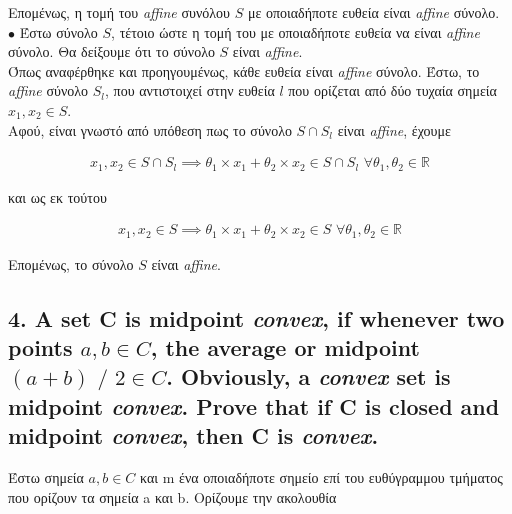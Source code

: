 \documentclass[12pt]{article}
\newcommand{\R}{\mathbb{R}}
\newcommand{\margin}{\hspace{4pt}}
\begin{document}
Επομένως, η τομή του \textit{affine} συνόλου $S$ με οποιαδήποτε ευθεία είναι \textit{affine} σύνολο.\\

$\bullet$ Έστω σύνολο $S$, τέτοιο ώστε η τομή του με οποιαδήποτε ευθεία να είναι \textit{affine} σύνολο.
Θα δείξουμε ότι το σύνολο $S$ είναι \textit{affine}.\\

Όπως αναφέρθηκε και προηγουμένως, κάθε ευθεία είναι \textit{affine} σύνολο.
Έστω, το \textit{affine} σύνολο $S_l$, που αντιστοιχεί στην ευθεία $l$
που ορίζεται από δύο τυχαία σημεία $x_1, x_2 \in S$.\\

Αφού, είναι γνωστό από υπόθεση πως το σύνολο $S \cap S_l$ είναι \textit{affine}, έχουμε

\begin{align*}
    x_1, x_2 \in S \cap S_l \implies  \theta_1 \times x_1 + \theta_2 \times x_2 \in S \cap S_l \margin \forall \theta_1, \theta_2 \in \R
\end{align*}

και ως εκ τούτου

\begin{align*}
    x_1, x_2 \in S \implies  \theta_1 \times x_1 + \theta_2 \times x_2 \in S \margin \forall \theta_1, \theta_2 \in \R
\end{align*}

Επομένως, το σύνολο $S$ είναι \textit{affine}.

\vspace{2in} %

\pagebreak

\subsection*{4. A set C is midpoint \textit{convex}, if whenever two points $a, b \in C$, the average or midpoint
$(a + b) \text{ / } 2 \in C$. Obviously, a \textit{convex} set is midpoint \textit{convex}. Prove that if C is closed and
midpoint \textit{convex}, then C is \textit{convex}.}

Έστω σημεία $a, b \in C$ και m ένα οποιαδήποτε σημείο επί του ευθύγραμμου τμήματος που ορίζουν τα σημεία a και b.
Ορίζουμε την ακολουθία\\
\end{document}

